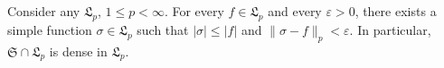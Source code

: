 Consider any $\mathfrak{L}_p$, $1 \leq p < \infty$. For every $f \in \mathfrak{L}_p$ and every $\varepsilon > 0$, there exists a simple function $\sigma \in \mathfrak{L}_p$ such that $|\sigma| \leq |f|$ and $\|\sigma - f\|_p < \varepsilon$. In particular, $\mathfrak{S} \cap \mathfrak{L}_p$ is dense in $\mathfrak{L}_p$.